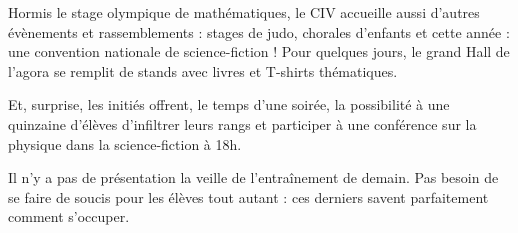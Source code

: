 Hormis le stage olympique de mathématiques, le CIV accueille aussi d’autres évènements et rassemblements : stages de judo, chorales d’enfants et cette année : une convention nationale de science-fiction ! Pour quelques jours, le grand Hall de l’agora se remplit de stands avec livres et T-shirts thématiques.

Et, surprise, les initiés offrent, le temps d’une soirée, la possibilité à une quinzaine d’élèves d’infiltrer leurs rangs et participer à une conférence sur la physique dans la science-fiction à 18h.

Il n’y a pas de présentation la veille de l’entraînement de demain. Pas besoin de se faire de soucis pour les élèves tout autant : ces derniers savent parfaitement comment s’occuper.